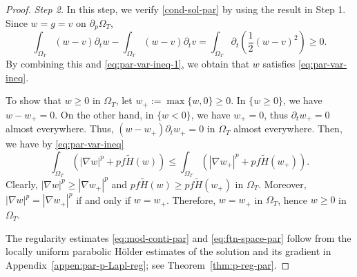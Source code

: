 \documentclass[11pt,oneside,english]{amsart}
\newcommand{\D}{\nabla}
\numberwithin{equation}{section}
\theoremstyle{plain}
\numberwithin{equation}{section}
\begin{document}
\begin{proof}
\medskip\noindent\emph{Step 2.} In this step, we verify \ref{cond-sol-par} by using the result in Step 1.
 Since $w=g=v$ on $\partial_p\Omega_T$,
$$
\int_{\Omega_T}(w-v)\partial_tw-\int_{\Omega_T}(w-v)\partial_tv=\int_{\Omega_T}\partial_t\left(\frac12(w-v)^2\right)\ge0.
$$
By combining this and \eqref{eq:par-var-ineq-1}, we obtain that $w$ satisfies \eqref{eq:par-var-ineq}.

To show that $w\ge0$ in $\Omega_T$, let $w_+:=\max\{w,0\}\ge0$. In $\{w\ge0\}$, we have $w-w_+=0$. On the other hand, in $\{w<0\}$, we have $w_+=0$, thus $\partial_tw_+=0$ almost everywhere. Thus, $(w-w_+)\partial_tw_+=0$ in $\Omega_T$ almost everywhere. Then, we have by 
\eqref{eq:par-var-ineq}
$$
\int_{\Omega_T}\left(|\D w|^p+pf\tilde H(w)\right)\le\int_{\Omega_T}\left(|\D w_+|^p+pf\tilde H(w_+)\right).
$$
Clearly, $|\D w|^p\ge |\D w_+|^p$ and $pf\tilde H(w)\ge pf\tilde H(w_+)$ in $\Omega_T$. Moreover, $|\D w|^p=|\D w_+|^p$ if and only if $w=w_+$. Therefore, $w=w_+$ in $\Omega_T$, hence $w\ge0$ in $\Omega_T$.

The regularity estimates \eqref{eq:mod-conti-par} and \eqref{eq:ftn-space-par} follow from the locally uniform parabolic Hölder estimates of the solution and its gradient in Appendix~\ref{appen:par-p-Lapl-reg}; see Theorem~\ref{thm:p-reg-par}.



\medskip


\end{proof}
\end{document}
